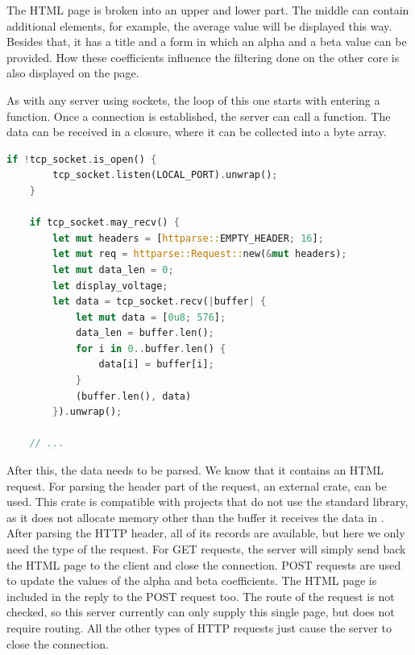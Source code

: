 The HTML page is broken into an upper and lower part. The middle can contain additional elements, for example, the average value will be displayed this way. Besides that, it has a title and a form in which an alpha and a beta value can be provided. How these coefficients influence the filtering done on the other core is also displayed on the page.

As with any server using sockets, the loop of this one starts with entering a  function. Once a connection is established, the server can call a  function. The data can be received in a closure, where it can be collected into a byte array.

\begin{lstlisting}[language=Rust,frame=single,float=!ht,style=customrust,label={lst:server-recv},caption={Receiving the Contents of the TCP Buffer}]
    if !tcp_socket.is_open() {
        tcp_socket.listen(LOCAL_PORT).unwrap();
    }

    if tcp_socket.may_recv() {
        let mut headers = [httparse::EMPTY_HEADER; 16];
        let mut req = httparse::Request::new(&mut headers);
        let mut data_len = 0;
        let display_voltage;
        let data = tcp_socket.recv(|buffer| {
            let mut data = [0u8; 576];
            data_len = buffer.len();
            for i in 0..buffer.len() {
                data[i] = buffer[i];
            }
            (buffer.len(), data)
        }).unwrap();

    // ...
\end{lstlisting}

After this, the data needs to be parsed. We know that it contains an HTML request. For parsing the header part of the request, an external crate,  can be used. This crate is compatible with projects that do not use the standard library, as it does not allocate memory other than the buffer it receives the data in \cite{Httparse}. After parsing the HTTP header, all of its records are available, but here we only need the type of the request. For GET requests, the server will simply send back the HTML page to the client and close the connection. POST requests are used to update the values of the alpha and beta coefficients. The HTML page is included in the reply to the POST request too. The route of the request is not checked, so this server currently can only supply this single page, but does not require routing. All the other types of HTTP requests just cause the server to close the connection.

